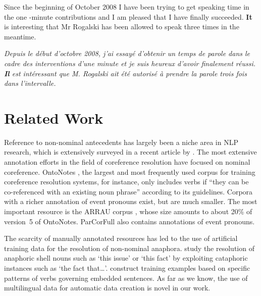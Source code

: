 \documentclass[10pt, a4paper]{article}
\begin{document}
\begin{enumerate}
Since the beginning of October 2008 I have been trying to get speaking time in
the one -minute contributions and I am pleased that I have finally succeeded.
\textbf{It} is interesting that Mr Rogalski has been allowed to speak three times in the meantime. 


\textit{Depuis le début d'octobre 2008, j'ai essayé d'obtenir un temps de parole
dans le cadre des interventions d'une minute et je suis heureux d'avoir
finalement réussi. \textbf{Il} est intéressant que M. Rogalski ait été autorisé à prendre la parole trois fois dans l'intervalle.}





\end{enumerate}



\section{Related Work}

Reference to non-nominal antecedents has largely been a niche area in NLP
research, which is extensively surveyed in a recent article by
. The most extensive annotation efforts in
the field of coreference resolution have focused on nominal coreference.
OntoNotes \cite{Pradhan:2013}, the largest and most frequently used corpus for
training coreference resolution systems, for instance, only includes verbs if
``they can be co-referenced with an existing noun phrase'' according to its
guidelines. Corpora with a richer annotation of event pronouns exist, but are
much smaller. The most important resource is the ARRAU corpus
\cite{poesio-etal-2018-anaphora}, whose size amounts to about 20\% of version~5
of OntoNotes. ParCorFull \cite{Lapshinova-Koltunski-Hardmeier-Krielke2018} also
contains annotations of event pronouns.

The scarcity of manually annotated resources has led to the use of artificial
training data for the resolution of non-nominal anaphora.
 study the resolution of anaphoric
shell nouns such as `this issue' or `this fact' by exploiting
cataphoric instances such as `the fact that\ldots'.
 construct training examples based on
specific patterns of verbs governing embedded sentences. As far as we know, the
use of multilingual data for automatic data creation is novel in our work.
\end{document}
